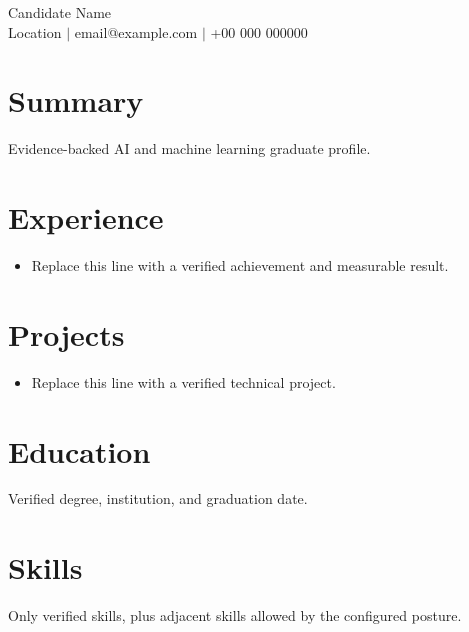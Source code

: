 \documentclass[10pt,a4paper]{article}
\begin{document}
\begin{center}
{\LARGE Candidate Name}\\
Location $\vert$ email@example.com $\vert$ +00 000 000000
\end{center}
\section{Summary}
Evidence-backed AI and machine learning graduate profile.
\section{Experience}
\begin{itemize}
\item Replace this line with a verified achievement and measurable result.
\end{itemize}
\section{Projects}
\begin{itemize}
\item Replace this line with a verified technical project.
\end{itemize}
\section{Education}
Verified degree, institution, and graduation date.
\section{Skills}
Only verified skills, plus adjacent skills allowed by the configured posture.
\end{document}
